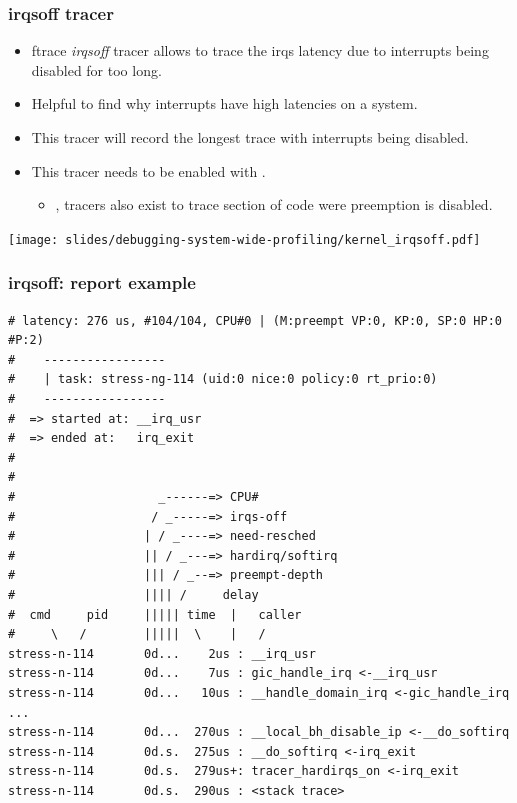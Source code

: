 \begin{frame}
  \frametitle{irqsoff tracer}
  \begin{itemize}
    \item ftrace {\em irqsoff} tracer allows to trace the irqs latency due to
          interrupts being disabled for too long.
    \item Helpful to find why interrupts have high latencies on a system.
    \item This tracer will record the longest trace with interrupts being disabled.
    \item This tracer needs to be enabled with .
    \begin{itemize}
      \item {},  tracers also exist to trace
            section of code were preemption is disabled.
    \end{itemize}
  \end{itemize}
  \center\texttt{[image: slides/debugging-system-wide-profiling/kernel\_irqsoff.pdf]}
\end{frame}

\begin{frame}[fragile]
  \frametitle{irqsoff: report example}
  \begin{block}{}
    \begin{verbatim}
# latency: 276 us, #104/104, CPU#0 | (M:preempt VP:0, KP:0, SP:0 HP:0 #P:2)
#    -----------------
#    | task: stress-ng-114 (uid:0 nice:0 policy:0 rt_prio:0)
#    -----------------
#  => started at: __irq_usr
#  => ended at:   irq_exit
#
#
#                    _------=> CPU#            
#                   / _-----=> irqs-off        
#                  | / _----=> need-resched    
#                  || / _---=> hardirq/softirq 
#                  ||| / _--=> preempt-depth   
#                  |||| /     delay            
#  cmd     pid     ||||| time  |   caller      
#     \   /        |||||  \    |   /         
stress-n-114       0d...    2us : __irq_usr
stress-n-114       0d...    7us : gic_handle_irq <-__irq_usr
stress-n-114       0d...   10us : __handle_domain_irq <-gic_handle_irq
...
stress-n-114       0d...  270us : __local_bh_disable_ip <-__do_softirq
stress-n-114       0d.s.  275us : __do_softirq <-irq_exit
stress-n-114       0d.s.  279us+: tracer_hardirqs_on <-irq_exit
stress-n-114       0d.s.  290us : <stack trace>
    \end{verbatim}
  \end{block}
\end{frame}

